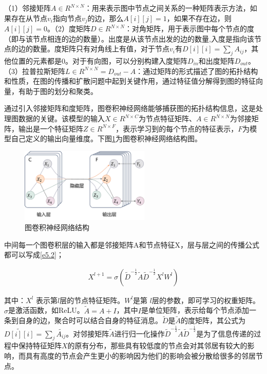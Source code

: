 （1）邻接矩阵$A \in R^{N×N}$：用来表示图中节点之间关系的一种矩阵表示方法，如果存在从节点$v_i$指向节点$v_j$的边，那么$A[i][j] = 1$，如果不存在边，则$A[i][j] = 0$。（2）度矩阵$D \in R^{N×N}$：对角矩阵，用于表示图中每个节点的度（即与该节点相连的边的数量）。出度是从该节点出发的边的数量,入度是指向该节点的边的数量。度矩阵只有对角线上有值，对于节点$v_i$有$D[i][i] = \sum_j A_{ij}$，其他位置的元素都是0。对于有向图，可以分别构建入度矩阵$D_{in}$和出度矩阵$D_{out}$。（3）拉普拉斯矩阵$L \in R^{N×N} = D_{out} - A$：通过矩阵的形式描述了图的拓扑结构和性质，在图的传播和扩散问题中起到关键作用，通过特征值分解得到图的特征向量，有助于图的划分和聚类。

通过引入邻接矩阵和度矩阵，图卷积神经网络能够捕获图的拓扑结构信息，这是处理图数据的关键。该模型的输入$X \in R^{N×C}$为节点特征矩阵、$A \in R^{N×N}$为邻接矩阵，输出是一个特征矩阵$Z \in R^{N×F}$，表示学习到的每个节点的特征表示，$F$为模型自己定义的输出向量维度。下图\ref{fig:gcn}为图卷积神经网络结构图。
\begin{figure}[H]
  \centering
  \includegraphics[width=0.55\textwidth]{figures/gcn.png}
  \caption{图卷积神经网络结构}\label{fig:gcn}
\end{figure}

中间每一个图卷积层的输入都是邻接矩阵A和节点特征X，层与层之间的传播公式都可以写成\ref{e5.2}；

\begin{equation}\label{e5.2}
  \begin{split}
    X^{l+1} = \sigma(\tilde{D}^{-\frac{1}{2}}\tilde{A}\tilde{D}^{-\frac{1}{2}}X^{l}W^{l})
  \end{split}
\end{equation}

其中：$X^{l}$ 表示第$l$层的节点特征矩阵。$W^{l}$是第 $l$层的参数，即可学习的权重矩阵。$\sigma$是激活函数，如ReLU。$\tilde{A} = A + I$，其中$I$是单位矩阵，表示给每个节点添加一条到自身的边，聚合时可以结合自身的特征消息。$\tilde{D}$是$\tilde{A}$的度矩阵，其公式为$\tilde{D[i][i]} = \sum_j \tilde{A_{ij}}$。对邻接矩阵$\tilde{A}$进行归一化操作$\tilde{D}^{-\frac{1}{2}}\tilde{A}\tilde{D}^{-\frac{1}{2}}$是为了信息传递的过程中保持特征矩阵$X$的原有分布，那些具有较低度的节点会对其邻居有较大的影响，而具有高度的节点会产生更小的影响因为他们的影响会被分散给很多的邻居节点。

